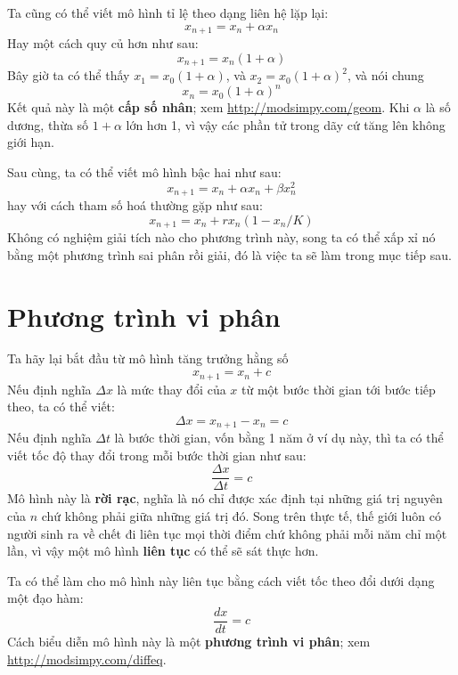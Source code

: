 \documentclass[12pt, openany]{book}
\theoremstyle{exercise}
\begin{document}
Ta cũng có thể viết mô hình tỉ lệ theo dạng liên hệ lặp lại:
%
\[ x_{n+1} = x_n + \alpha x_n \]
%
Hay một cách quy củ hơn như sau:
%
\[ x_{n+1} = x_n (1 + \alpha) \]
%
Bây giờ ta có thể thấy $x_1 = x_0 (1 + \alpha)$, và $x_2 = x_0 (1 + \alpha)^2$, và nói chung 
%
\[ x_n = x_0 (1 + \alpha)^n \]
%
Kết quả này là một {\bf cấp số nhân}; xem \url{http://modsimpy.com/geom}.  Khi $\alpha$ là số dương, thừa số $1+\alpha$ lớn hơn 1, vì vậy các phần tử trong dãy cứ tăng lên không giới hạn.


Sau cùng, ta có thể viết mô hình bậc hai như sau:
%
\[ x_{n+1} = x_n + \alpha x_n + \beta x_n^2 \]
%
hay với cách tham số hoá thường gặp như sau:
%
\[ x_{n+1} = x_n + r x_n (1 - x_n / K) \]
%
Không có nghiệm giải tích nào cho phương trình này, song ta có thể xấp xỉ nó bằng một phương trình sai phân rồi giải, đó là việc ta sẽ làm trong mục tiếp sau.


\section{Phương trình vi phân}
\label{diffeq}

Ta hãy lại bắt đầu từ mô hình tăng trưởng hằng số
%
\[ x_{n+1} = x_n + c \]
%
Nếu định nghĩa $\Delta x$ là mức thay đổi của $x$ từ một bước thời gian tới bước tiếp theo, ta có thể viết:
%
\[ \Delta x = x_{n+1} - x_n = c \]
%
Nếu định nghĩa $\Delta t$ là bước thời gian, vốn bằng 1 năm ở ví dụ này, thì ta có thể viết tốc độ thay đổi trong mỗi bước thời gian như sau:
%
\[ \frac{\Delta x}{\Delta t} = c \]
%
Mô hình này là {\bf rời rạc}, nghĩa là nó chỉ được xác định tại những giá trị nguyên của $n$ chứ không phải giữa những giá trị đó. Song trên thực tế, thế giới luôn có người sinh ra về chết đi liên tục mọi thời điểm chứ không phải mỗi năm chỉ một lần, vì vậy một mô hình {\bf liên tục} có thể sẽ sát thực hơn.


Ta có thể làm cho mô hình này liên tục bằng cách viết tốc theo đổi dưới dạng một đạo hàm:
%
\[ \frac{dx}{dt} = c \]
%
Cách biểu diễn mô hình này là một {\bf phương trình vi phân}; xem \url{http://modsimpy.com/diffeq}.

\end{document}
